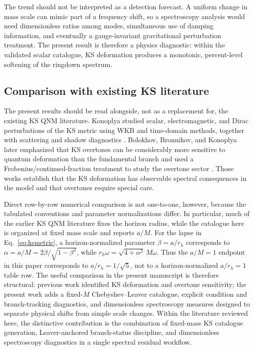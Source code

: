 \documentclass[10pt,letterpaper,twocolumn]{article}
\begin{document}
The trend should not be interpreted as a detection forecast. A uniform change in mass scale can mimic part of a frequency shift, so a spectroscopy analysis would need dimensionless ratios among modes, simultaneous use of damping information, and eventually a gauge-invariant gravitational perturbation treatment. The present result is therefore a physics diagnostic: within the validated scalar catalogue, KS deformation produces a monotonic, percent-level softening of the ringdown spectrum.

\subsection{Comparison with existing KS literature}

The present results should be read alongside, not as a replacement for, the existing KS QNM literature. Konoplya studied scalar, electromagnetic, and Dirac perturbations of the KS metric using WKB and time-domain methods, together with scattering and shadow diagnostics \cite{Konoplya2020}. Bolokhov, Bronnikov, and Konoplya later emphasized that KS overtones can be considerably more sensitive to quantum deformation than the fundamental branch and used a Frobenius/continued-fraction treatment to study the overtone sector \cite{Bolokhov2025}. Those works establish that the KS deformation has observable spectral consequences in the model and that overtones require special care.

Direct row-by-row numerical comparison is not one-to-one, however, because the tabulated conventions and parameter normalizations differ. In particular, much of the earlier KS QNM literature fixes the horizon radius, while the catalogue here is organized at fixed mass scale and reports \(a/M\). For the lapse in Eq.~\eqref{eq:ksmetric}, a horizon-normalized parameter \(\beta=a/r_h\) corresponds to \(\alpha=a/M=2\beta/\sqrt{1-\beta^2}\), while \(r_h\omega=\sqrt{4+\alpha^2}\,M\omega\). Thus the \(a/M=1\) endpoint in this paper corresponds to \(a/r_h=1/\sqrt{5}\), not to a horizon-normalized \(a/r_h=1\) table row. The useful comparison in the present manuscript is therefore structural: previous work identified KS deformation and overtone sensitivity; the present work adds a fixed-\(M\) Chebyshev--Leaver catalogue, explicit condition and branch-tracking diagnostics, and dimensionless spectroscopy measures designed to separate physical shifts from simple scale changes. Within the literature reviewed here, the distinctive contribution is the combination of fixed-mass KS catalogue generation, Leaver-anchored branch-status discipline, and dimensionless spectroscopy diagnostics in a single spectral residual workflow.
\end{document}
